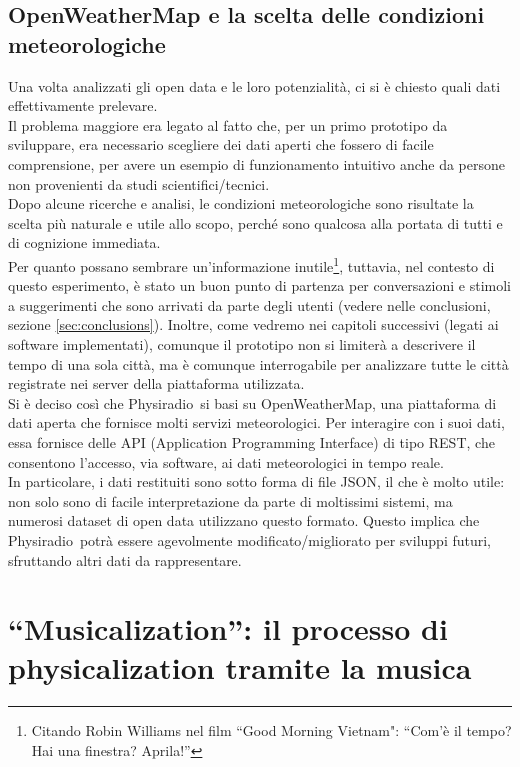 \documentclass[12pt,a4paper]{report}
\newcommand{\physiradio}{Physiradio} %
\begin{document}
\subsection{OpenWeatherMap e la scelta delle condizioni meteorologiche}\label{sec:openweather}

Una volta analizzati gli open data e le loro potenzialità, ci si è chiesto quali dati effettivamente prelevare.\\
Il problema maggiore era legato al fatto che, per un primo prototipo da sviluppare, era necessario scegliere dei dati aperti che fossero di facile comprensione, per avere un esempio di funzionamento intuitivo anche da persone non provenienti da studi scientifici/tecnici.\\

Dopo alcune ricerche e analisi, le condizioni meteorologiche sono risultate la scelta più naturale e utile allo scopo, perché sono qualcosa alla portata di tutti e di cognizione immediata.\\
Per quanto possano sembrare un'informazione inutile\footnote{Citando Robin Williams nel film ``Good Morning Vietnam": ``Com'è il tempo? Hai una finestra? Aprila!''}, tuttavia, nel contesto di questo esperimento, è stato un buon punto di partenza per conversazioni e stimoli a suggerimenti che sono arrivati da parte degli utenti (vedere nelle conclusioni, sezione \ref{sec:conclusions}). Inoltre, come vedremo nei capitoli successivi (legati ai software implementati), comunque il prototipo non si limiterà a descrivere il tempo di una sola città, ma è comunque interrogabile per analizzare tutte le città registrate nei server della piattaforma utilizzata.\\

Si è deciso così che \physiradio\ si basi su OpenWeatherMap\cite{openWeather}, una piattaforma di dati aperta che fornisce molti servizi meteorologici. Per interagire con i suoi dati, essa fornisce delle API (Application Programming Interface) di tipo REST, che consentono l'accesso, via software, ai dati meteorologici in tempo reale.\\
In particolare, i dati restituiti sono sotto forma di file JSON, il che è molto utile: non solo sono di facile interpretazione da parte di moltissimi sistemi, ma numerosi dataset di open data utilizzano questo formato. Questo implica che \physiradio\ potrà essere agevolmente modificato/migliorato per sviluppi futuri, sfruttando altri dati da rappresentare. 


\section{``Musicalization'': il processo di physicalization tramite la musica}\label{sec:musicalization}
\end{document}
